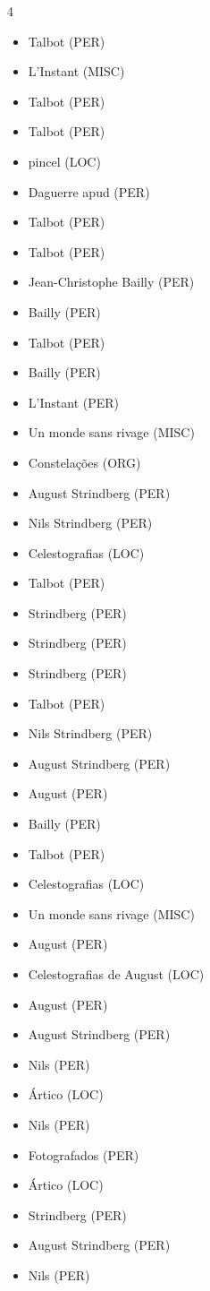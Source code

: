 \documentclass{article}
\begin{document}
\begin{multicols}{4}
\begin{itemize}
\item Talbot (PER)
\item L’Instant (MISC)
\item Talbot (PER)
\item Talbot (PER)
\item pincel (LOC)
\item Daguerre apud (PER)
\item Talbot (PER)
\item Talbot (PER)
\item Jean-Christophe Bailly (PER)
\item Bailly (PER)
\item Talbot (PER)
\item Bailly (PER)
\item L’Instant (PER)
\item Un monde sans rivage (MISC)
\item Constelações (ORG)
\item August Strindberg (PER)
\item Nils Strindberg (PER)
\item Celestografias (LOC)
\item Talbot (PER)
\item Strindberg (PER)
\item Strindberg (PER)
\item Strindberg (PER)
\item Talbot (PER)
\item Nils Strindberg (PER)
\item August Strindberg (PER)
\item August (PER)
\item Bailly (PER)
\item Talbot (PER)
\item Celestografias (LOC)
\item Un monde sans rivage (MISC)
\item August (PER)
\item Celestografias de August (LOC)
\item August (PER)
\item August Strindberg (PER)
\item Nils (PER)
\item Ártico (LOC)
\item Nils (PER)
\item Fotografados (PER)
\item Ártico (LOC)
\item Strindberg (PER)
\item August Strindberg (PER)
\item Nils (PER)

\end{itemize}
\end{multicols}
\end{document}
